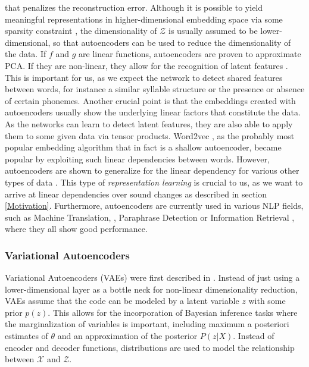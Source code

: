 \documentclass[6pt]{article}
\begin{document}
that penalizes the reconstruction error. Although it is possible to yield meaningful representations in higher-dimensional embedding space via some sparsity constraint \citep{ng2011sparse}, the dimensionality of $\mathcal{Z}$ is usually assumed to be lower-dimensional, so that autoencoders can be used to reduce the dimensionality of the data. If $f$ and $g$ are linear functions, autoencoders are proven to approximate PCA. If they are non-linear, they allow for the recognition of latent features \citep{hinton2006reducing}. This is important for us, as we expect the network to detect shared features between words, for instance a similar syllable structure or the presence or absence of certain phonemes. Another crucial point is that the embeddings created with autoencoders usually show the underlying linear factors that constitute the data. As the networks can learn to detect latent features, they are also able to apply them to some given data via tensor products. Word2vec \citep{mikolov2013efficient,mikolov2013distributed,goldberg2014word2vec}, as the probably most popular embedding algorithm that in fact is a shallow autoencoder, became popular by exploiting such linear dependencies between words. However, autoencoders are shown to generalize for the linear dependency for various other types of data \citep{radford2015unsupervised,dosovitskiy2015learning}. This type of \textit{representation learning} \citep[p. 526]{Goodfellow-et-al-2016-Book} is crucial to us, as we want to arrive at linear dependencies over sound changes as described in section \ref{Motivation}.  Furthermore, autoencoders are currently used in various NLP fields, such as Machine Translation, \citep{lauly2014autoencoder,zhang2014bilingually}, Paraphrase Detection  \citep{socher2011dynamic} or Information Retrieval \citep{silberer2014learning,le2014distributed}, where they all show good performance. 
\subsubsection{Variational Autoencoders}
\label{Variational Autoencoders}

Variational Autoencoders (VAEs) were first described in \cite{kingma2013auto}. Instead of just using a lower-dimensional layer as a bottle neck for non-linear dimensionality reduction, VAEs assume that the code can be modeled by a latent variable $z$ with some prior $p(z)$. This allows for the incorporation of Bayesian inference tasks where the marginalization of variables is important, including maximum a posteriori estimates of $\theta$ and an approximation of the posterior $P(z|X)$. Instead of encoder and decoder functions, distributions are used to model the relationship between $\mathcal{X} $ and $  \mathcal{Z}$.
\end{document}
